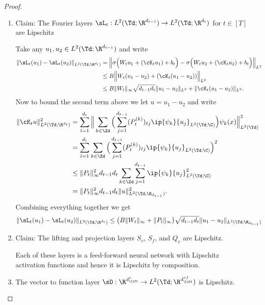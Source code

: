 \documentclass[letterpaper,11pt]{article}
\begin{document}
\begin{proof}~
\begin{enumerate}[label=(\roman*)]
    \item Claim: The Fourier layers $\sL_t: L^2(\Td; \R^{d_{t-1}}) \to L^2(\Td; \R^{d_t})$ for $t \in [T]$ are Lipschitz

    Take any $u_1, u_2 \in L^2(\Td; \R^{d_{t-1}})$ and write
    \begin{align*}
        \|\sL_t(u_1) - \sL_t(u_2)\|_{L^2(\Td; \R^{d_t})} &= \Big\|\sigma\Big(W_t u_1 + (\cK_t u_1) + b_t\Big) - \sigma\Big(W_t u_2 + (\cK_t u_2) + b_t\Big)\Big\|_{L^2}\\
        &\leq B\Big\|W_t (u_1 - u_2) + (\cK_t (u_1 - u_2))\Big\|_{L^2}\\
        &\leq B\|W_t\|_\infty\sqrt{d_{t-1}d_t}\|u_1 - u_2\|_{L^2} + \|\cK_t (u_1 - u_2)\|_{L^2}.
    \end{align*}
    Now to bound the second term above we let $u = u_1 - u_2$ and write
    \begin{align*}
        \|\cK_t u\|_{L^2(\Td; \R^{d_t})}^2 &= \sum_{l=1}^{d_t}\Big\|\sum_{k \in \Zd}\Big(\sum_{j=1}^{d_{t-1}} (P^{(k)}_t)_{\ell j}\ip{\psi_k}{u_j}_{L^2(\Td;\C)} \Big)\psi_k(x)\Big\|_{L^2(\Td)}^2\\
        &= \sum_{l=1}^{d_t}\sum_{k \in \Zd}\Big(\sum_{j=1}^{d_{t-1}} (P^{(k)}_t)_{\ell j}\ip{\psi_k}{u_j}_{L^2(\Td;\C)} \Big)^2\\
        &\leq \|P_t\|_\infty^2d_{t-1}d_t\sum_{k \in \Zd}\sum_{j=1}^{d_{t-1}} \ip{\psi_k}{u_j}_{L^2(\Td;\C)}^2\\
        &= \|P_t\|_\infty^2d_{t-1}d_t\|u\|_{L^2(\Td;\R_{d_{t-1}})}^2.
    \end{align*}
    Combining everything together we get
    \begin{equation}
        \|\sL_t(u_1) - \sL_t(u_2)\|_{L^2(\Td; \R^{d_t})} \leq \big(B\|W_t\|_\infty + \|P_t\|_\infty\big)\sqrt{d_{t-1}d_t}\|u_1 - u_2\|_{L^2(\Td;\R_{d_{t-1}})}
    \end{equation}
    
    \item Claim: The lifting and projection layers $S_v$, $S_f$, and $Q_v$ are Lipschitz. 

    Each of these layers is a feed-forward neural network with Lipschitz activation functions and hence it is Lipschitz by composition.
    
    \item The vector to function layer $\sD: \R^{d_{\lift}^v} \to L^2(\Td; \R^{d_{\lift}^{vf}})$ is Lipschitz.


\end{enumerate}
\end{proof}
\end{document}
